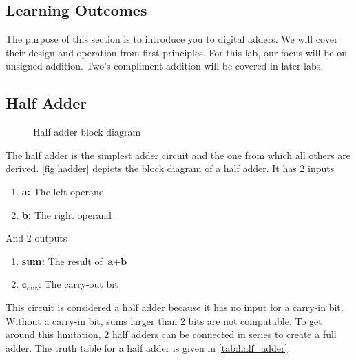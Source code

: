 \documentclass[12pt]{labmanual}
\begin{document}
\subsection{Learning Outcomes}
The purpose of this section is to introduce you to digital adders. We will cover their design and operation from first principles. For this lab, our focus will be on unsigned addition. Two's compliment addition will be covered in later labs.

\subsection{Half Adder}
\begin{figure}
    \centering
{}
    \caption{Half adder block diagram}
    \label{fig:hadder}
\end{figure}%

The half adder is the simplest adder circuit and the one from which all others are derived. \autoref{fig:hadder} depicts the block diagram of a half adder. It has 2 inputs
\begin{enumerate}
    \item \textbf{a:} The left operand
    \item \textbf{b:} The right operand
\end{enumerate}
\clearpage
And 2 outputs
\begin{enumerate}
    \item \textbf{sum:} The result of $\textbf{a} + \textbf{b}$
    \item $\textbf{c}_\textbf{out}$: The carry-out bit
\end{enumerate}%
{\setlength{\linewidth}{\textwidth}
\noindent
This circuit is considered a half adder because it has no input for a carry-in bit. Without a carry-in bit, sums larger than 2 bits are not computable. To get around this limitation, 2 half adders can be connected in series to create a full adder. The truth table for a half adder is given in \autoref{tab:half_adder}.}
\end{document}
